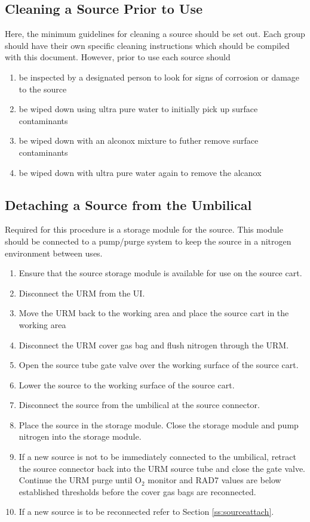 \subsection{Cleaning a Source Prior to Use}
Here, the minimum guidelines for cleaning a source should be set out. Each group should have their own specific cleaning instructions which should be compiled with this document. However, prior to use each source should
\begin{enumerate}
\item be inspected by a designated person to look for signs of corrosion or damage to the source
\item be wiped down using ultra pure water to initially pick up surface contaminants
\item be wiped down with an alconox mixture to futher remove surface contaminants
\item be wiped down with ultra pure water again to remove the alcanox
\end{enumerate}

\subsection{Detaching a Source from the Umbilical}
Required for this procedure is a storage module for the source. This module should be connected to a pump/purge system to keep the source in a nitrogen environment between uses.
\begin{enumerate}
\item Ensure that the source storage module is available for use on the source cart.
\item Disconnect the URM from the UI.
\item Move the URM back to the working area and place the source cart in the working area
\item Disconnect the URM cover gas bag and flush nitrogen through the URM.
\item Open the source tube gate valve over the working surface of the source cart.
\item Lower the source to the working surface of the source cart.
\item Disconnect the source from the umbilical at the source connector.
\item Place the source in the storage module. Close the storage module and pump nitrogen into the storage module.
\item If a new source is not to be immediately connected to the umbilical, retract the source connector back into the URM source tube and close the gate valve. Continue the URM purge until O$_{2}$ monitor and RAD7 values are below established thresholds before the cover gas bags are reconnected. 
\item If a new source is to be reconnected refer to Section \ref{ss:sourceattach}.
\end{enumerate}

